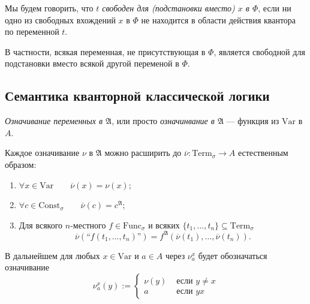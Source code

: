 \documentclass[12pt,a4paper]{article}
\newcommand{\Func}{\ensuremath{\mathrm{Func}}\xspace}
\newcommand{\Const}{\ensuremath{\mathrm{Const}}\xspace}
\newcommand{\Var}{\ensuremath{\mathrm{Var}}\xspace}
\newcommand{\Term}{\ensuremath{\mathrm{Term}}\xspace}
\begin{document}
    \begin{definition}
        Мы будем говорить, что \emph{$t$ свободен для (подстановки вместо) $x$ в $\Phi$}, если ни одно из свободных вхождений $x$ в $\Phi$ не находится в области действия квантора по переменной $t$.
    \end{definition}

    \begin{remark}
        В частности, всякая переменная, не присутствующая в $\Phi$, является свободной для подстановки вместо всякой другой переменой в $\Phi$.
    \end{remark}

    \subsection{Семантика кванторной классической логики}

    \begin{definition}
        \emph{Означивание переменных в $\mathfrak{A}$}, или просто \emph{означинвание в $\mathfrak{A}$} --- функция из $\Var$ в $A$.
        
        Каждое означивание $\nu$ в $\mathfrak{A}$ можно расширить до $\overline{\nu}: \Term_\sigma \rightarrow A$ естественным образом:
        \begin{enumerate}
            \item $\forall x \in \Var \qquad \overline{\nu}(x) = \nu(x)$;
            \item $\forall c \in \Const_\sigma \qquad \overline{\nu}(c) = c^\mathfrak{A}$;
            \item Для всякого $n$-местного $f \in \Func_\sigma$ и всяких $\{t_1, \dots, t_n\} \subseteq \Term_\sigma$
                \[
                    \overline{\nu}(\text{``$f(t_1, \dots, t_n)$''})
                    = f^\mathfrak{A}(\overline{\nu}(t_1), \dots, \overline{\nu}(t_n)).
                \]
        \end{enumerate}

        В дальнейшем для любых $x \in \Var$ и $a \in A$ через $\nu_a^x$ будет обозначаться означивание
        \[
            \nu_a^x(y) :=
            \begin{cases}
                \nu(y)& \text{ если $y \neq x$}\\
                a& \text{ если $y  x$}
            \end{cases}
        \]

    \end{definition}
\end{document}
